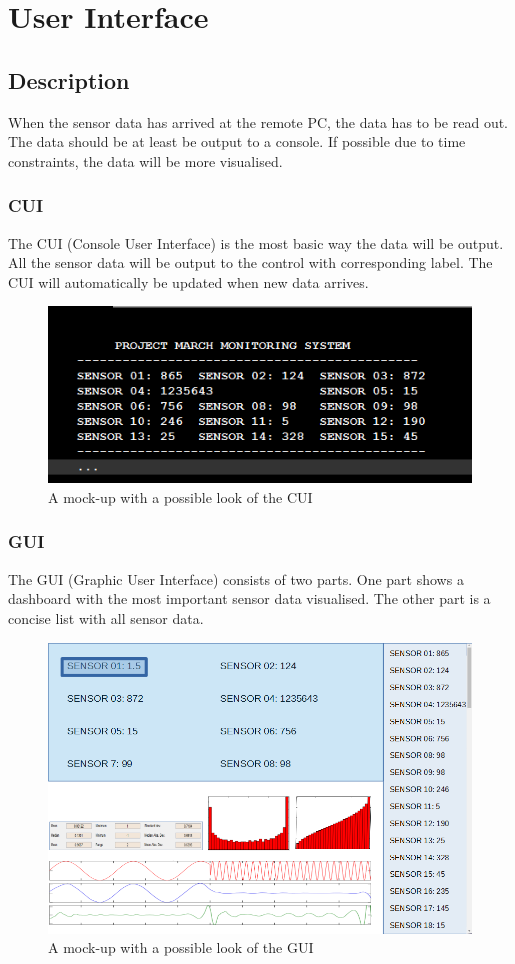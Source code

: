 \section{User Interface}
\subsection{Description}
When the sensor data has arrived at the remote PC, the data has to be read out. The data should be at least be output to a console. If possible due to time constraints, the data will be more visualised.
\subsubsection{CUI}
The CUI (Console User Interface) is the most basic way the data will be output. All the sensor data will be output to the control with corresponding label. The CUI will automatically be updated when new data arrives. 
\begin{figure}[H]
	\includegraphics{MockupCUI}
	\caption{A mock-up with a possible look of the CUI} 
\end{figure} 
\subsubsection{GUI}
The GUI (Graphic User Interface) consists of two parts. One part shows a dashboard with the most important sensor data visualised. The other part is a concise list with all sensor data.  
\begin{figure}[H]
	\includegraphics[width=500px]{MockupGUI}
	\caption{A mock-up with a possible look of the GUI} 
\end{figure} 
